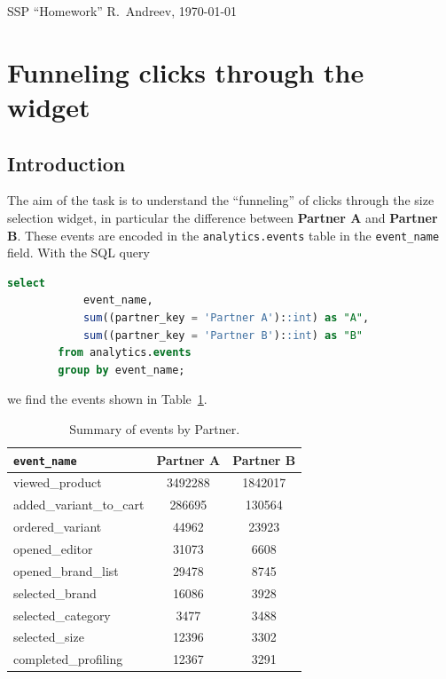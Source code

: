 \documentclass[12pt,a4paper]{article}
\begin{document}
    SSP ``Homework''
    \hfill 
    R.~Andreev, \today
    
    \section{Funneling clicks through the widget}
    
    
    \subsection{Introduction}
    
    The aim of the task is to understand
    the ``funneling'' of clicks through 
    the size selection widget,
    in particular the difference
    between 
    \textbf{Partner A} and \textbf{Partner B}.
    These events are encoded in 
    the \texttt{analytics.events} table
    in the \texttt{event\_name} field.
    With the SQL query
    \begin{lstlisting}[language=SQL]
        select 
            event_name, 
            sum((partner_key = 'Partner A')::int) as "A", 
            sum((partner_key = 'Partner B')::int) as "B"
        from analytics.events
        group by event_name;
    \end{lstlisting}
    we find the events shown in Table~\ref{t:ev_by_pk}.
    \begin{table}[p]
        \begin{center}
            \small
            \begin{tabular}{l|cc}
                \texttt{event\_name}     & Partner A & Partner B \\
                \hline
                viewed\_product          & 3492288 & 1842017 \\
                added\_variant\_to\_cart & 286695  & 130564  \\
                ordered\_variant         & 44962   & 23923  \\
                \hline
                opened\_editor           & 31073   & 6608    \\
                opened\_brand\_list      & 29478   & 8745    \\
                selected\_brand          & 16086   & 3928    \\
                selected\_category       & 3477    & 3488    \\
                selected\_size           & 12396   & 3302    \\
                completed\_profiling     & 12367   & 3291    \\
            \end{tabular}
        \end{center}
        \caption{Summary of events by Partner.}
        \label{t:ev_by_pk}
    \end{table}
    
\end{document}
